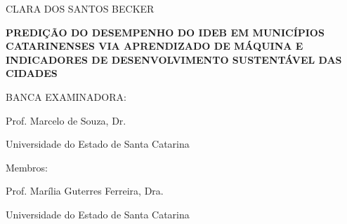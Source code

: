  

%
% 
%
\begin{folhadeaprovacao}



	\begin{center}
		{\selectfont\MakeTextUppercase{CLARA DOS SANTOS BECKER}}
	\end{center}
    \vfill
    
	\vfill
	\begin{center}
		\textbf{\MakeTextUppercase{PREDIÇÃO DO DESEMPENHO DO IDEB EM MUNICÍPIOS CATARINENSES VIA APRENDIZADO DE MÁQUINA E INDICADORES DE DESENVOLVIMENTO SUSTENTÁVEL DAS CIDADES}}
	\end{center}
	\vfill

    
%


\vfill
        
	 \begin{center}
	 	
    	{\selectfont BANCA EXAMINADORA: }
    	\vspace*{1.75cm}
    
		Prof. Marcelo de Souza, Dr. \par
		Universidade do Estado de Santa Catarina
	 \end{center}
	
    {Membros:} 
    
	\begin{center}
		\vspace*{1.25cm}
		Prof. Marília Guterres Ferreira, Dra.\par
		Universidade do Estado de Santa Catarina
		

\end{center}
\end{folhadeaprovacao}
